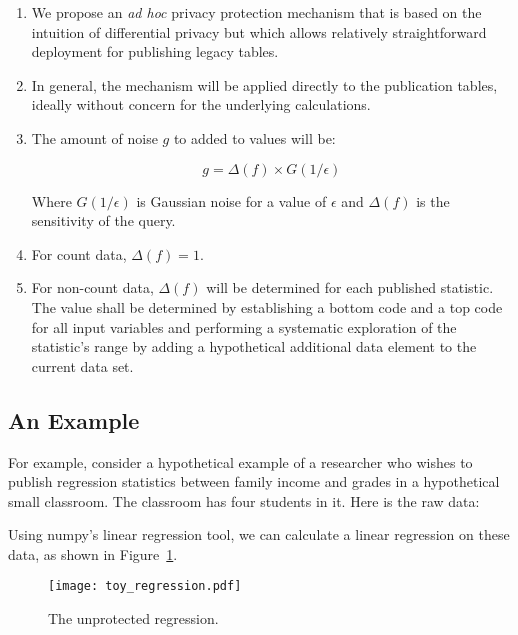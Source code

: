 \documentclass{article}
\begin{document}
\begin{enumerate}
\item We propose an \emph{ad hoc} privacy protection mechanism that is based on
the intuition of differential privacy but which allows relatively
straightforward deployment for publishing legacy tables.

\item In general, the mechanism will be applied directly to the
publication tables, ideally without concern for the underlying
calculations.

\item The amount of noise $g$ to added to values will be:

\begin{equation}
g = \Delta(f) \times G(1/\epsilon)
\end{equation}

Where $G(1/\epsilon)$ is Gaussian noise for a value of $\epsilon$ and
$\Delta(f)$ is the sensitivity of the query.

\item For count data, $\Delta(f)=1$. 

\item For non-count data, $\Delta(f)$ will be determined for each
  published statistic. The value shall be determined by establishing a
  bottom code 
  and a top code for all input variables and performing a
  systematic exploration of the statistic's range by adding a
  hypothetical additional data element to the current data set. 

\end{enumerate}

\subsection{An Example}

For example, consider a hypothetical example of a researcher who
wishes to publish regression statistics between family income and
grades in a hypothetical small classroom. The classroom has four
students in it. Here is the raw data:



Using numpy's linear regression tool, we can calculate a linear
regression on these data, as shown in Figure~\ref{unprotected}.

\begin{figure}
\texttt{[image: toy\_regression.pdf]}
\caption{The unprotected regression.}\label{unprotected}
\end{figure}
\end{document}
